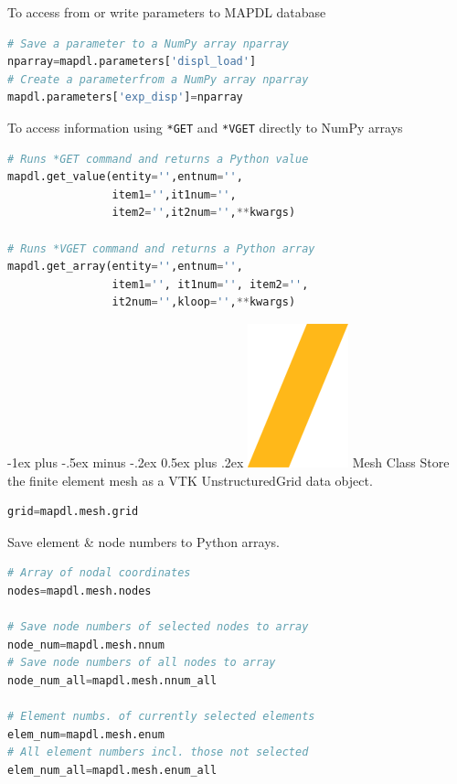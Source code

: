 \documentclass[9pt,landscape]{article}
\makeatletter
\renewcommand{\section}{\@startsection{section}{1}{0mm}%
                                {-1ex plus -.5ex minus -.2ex}%
                                {0.5ex plus .2ex}%
                                {\normalfont\large\bfseries}}
\def\code#1{\texttt{#1}}
\makeatother
\begin{document}
\begin{multicols}{3}
To access from or write parameters to MAPDL database
\begin{lstlisting}[language=Python]
# Save a parameter to a NumPy array nparray
nparray=mapdl.parameters['displ_load']
# Create a parameterfrom a NumPy array nparray
mapdl.parameters['exp_disp']=nparray
\end{lstlisting} 

To access information using \code{*GET} and \code{*VGET} directly to NumPy arrays
\begin{lstlisting}[language=Python]
# Runs *GET command and returns a Python value
mapdl.get_value(entity='',entnum='',
                item1='',it1num='',
                item2='',it2num='',**kwargs)

# Runs *VGET command and returns a Python array
mapdl.get_array(entity='',entnum='',
                item1='', it1num='', item2='',
                it2num='',kloop='',**kwargs)
\end{lstlisting} 
\vfill

\section{\includegraphics[height=\fontcharht\font`\S]{slash.png} Mesh Class}
Store the finite element mesh as a VTK UnstructuredGrid data object.
\begin{lstlisting}[language=Python]
grid=mapdl.mesh.grid
\end{lstlisting} 

Save element \& node numbers to Python arrays.
\begin{lstlisting}[language=Python]
# Array of nodal coordinates
nodes=mapdl.mesh.nodes

# Save node numbers of selected nodes to array
node_num=mapdl.mesh.nnum
# Save node numbers of all nodes to array
node_num_all=mapdl.mesh.nnum_all

# Element numbs. of currently selected elements
elem_num=mapdl.mesh.enum
# All element numbers incl. those not selected
elem_num_all=mapdl.mesh.enum_all
\end{lstlisting} 
\vfill


\end{multicols}
\end{document}
